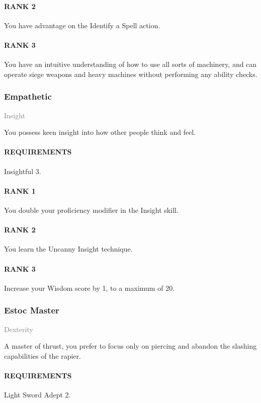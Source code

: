 \paragraph{RANK 2} You have advantage on the Identify a Spell action.
\paragraph{RANK 3} You have an intuitive understanding of how to use all sorts of machinery, and can operate siege weapons and heavy machines without performing any ability checks.

\subsubsection{Empathetic} \label{tal::empathetic}
\small{\textcolor{gray}{Insight}}

\normalsize
You possess keen insight into how other people think and feel.
\paragraph{REQUIREMENTS} Insightful 3.
\paragraph{RANK 1} You double your proficiency modifier in the Insight skill.
\paragraph{RANK 2} You learn the Uncanny Insight technique.
\paragraph{RANK 3} Increase your Wisdom score by 1, to a maximum of 20.

\subsubsection{Estoc Master} \label{tal::estocmaster}
\small{\textcolor{gray}{Dexterity}}

\normalsize
A master of thrust, you prefer to focus only on piercing and abandon the slashing capabilities of the rapier.
\paragraph{REQUIREMENTS} Light Sword Adept 2.
